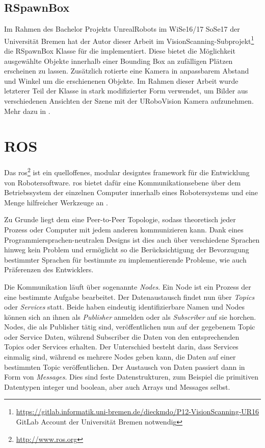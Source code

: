 \subsection{RSpawnBox}
\label{sec:rspawnbox}

Im Rahmen des Bachelor Projekts UnrealRobots im WiSe16/17 SoSe17 der Universität Bremen hat der Autor dieser Arbeit im VisionScanning-Subprojekt\footnote{\url{https://gitlab.informatik.uni-bremen.de/dieckmdo/P12-VisionScanning-UR16} GitLab Account der Universität Bremen notwendig} die RSpawnBox Klasse für die \unreal implementiert. Diese bietet die Möglichkeit ausgewählte Objekte innerhalb einer Bounding Box an zufälligen Plätzen erscheinen zu lassen. Zusätzlich rotierte eine Kamera in anpassbarem Abstand und Winkel um die erschienenen Objekte. Im Rahmen dieser Arbeit wurde letzterer Teil der Klasse in stark modifizierter Form verwendet, um Bilder aus verschiedenen Ansichten der Szene mit der URoboVision Kamera aufzunehmen. Mehr dazu in .         

\section{ROS}
\label{sec:ros}
Das \gls{ros}\footnote{\url{http://www.ros.org}} ist ein quelloffenes, modular designtes \gls{framework} für die Entwicklung von Robotersoftware. \gls{ros} bietet dafür eine Kommunikationsebene über dem Betriebssystem der einzelnen Computer innerhalb eines Robotersystems und eine Menge hilfreicher Werkzeuge an \cite{ros}.\par 

Zu Grunde liegt dem eine Peer-to-Peer Topologie, sodass theoretisch jeder Prozess oder Computer mit jedem anderen kommunizieren kann. Dank eines Programmiersprachen-neutralen Designs ist dies auch über verschiedene Sprachen hinweg kein Problem und ermöglicht so die Berücksichtigung der Bevorzugung bestimmter Sprachen für bestimmte zu implementierende Probleme, wie auch Präferenzen des Entwicklers.\par

Die Kommunikation läuft über sogenannte \textit{Nodes}. Ein Node ist ein Prozess der eine bestimmte Aufgabe bearbeitet. Der Datenaustausch findet nun über \textit{Topics} oder \textit{Services} statt. Beide haben eindeutig identifizierbare Namen und Nodes können sich an ihnen als \textit{Publisher} anmelden oder als \textit{Subscriber} auf sie horchen. Nodes, die als Publisher tätig sind, veröffentlichen nun auf der gegebenem Topic oder Service Daten, während Subscriber die Daten von den entsprechenden Topics oder Services erhalten. Der Unterschied besteht darin, dass Services einmalig sind, während es mehrere Nodes geben kann, die Daten auf einer bestimmten Topic veröffentlichen. Der Austausch von Daten passiert dann in Form von \textit{Messages}. Dies sind feste Datenstrukturen, zum Beispiel die primitiven Datentypen integer und boolean, aber auch Arrays und Messages selbst. \par

